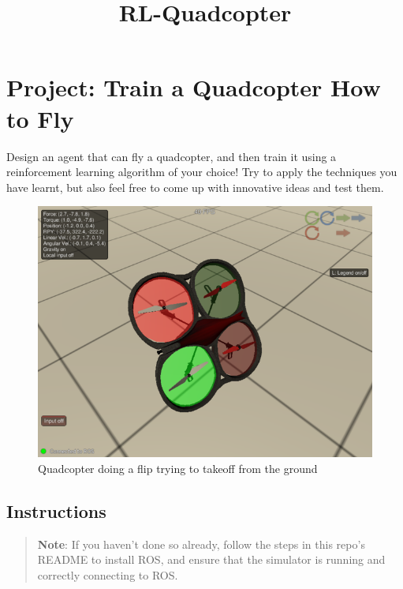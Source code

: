 \documentclass[11pt]{article}
\title{RL-Quadcopter}
\makeatletter
\def\maxwidth{\ifdim\Gin@nat@width>\linewidth\linewidth
    \else\Gin@nat@width\fi}
\let\Oldincludegraphics\includegraphics
\renewcommand{\includegraphics}[1]{\Oldincludegraphics[width=.8\maxwidth]{#1}}
\makeatother
\begin{document}
    
    
    \maketitle
    
    

    
    \section{Project: Train a Quadcopter How to
Fly}\label{project-train-a-quadcopter-how-to-fly}

Design an agent that can fly a quadcopter, and then train it using a
reinforcement learning algorithm of your choice! Try to apply the
techniques you have learnt, but also feel free to come up with
innovative ideas and test them.

\begin{figure}
\centering
\includegraphics{images/quadcopter_tumble.png}
\caption{Quadcopter doing a flip trying to takeoff from the ground}
\end{figure}

\subsection{Instructions}\label{instructions}

\begin{quote}
\textbf{Note}: If you haven't done so already, follow the steps in this
repo's README to install ROS, and ensure that the simulator is running
and correctly connecting to ROS.
\end{quote}
\end{document}
